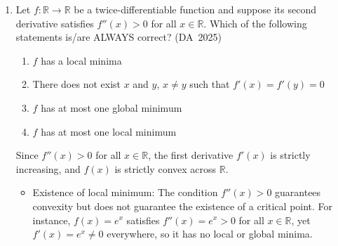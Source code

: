 \begin{enumerate}[label=\thesubsection.\arabic*, ref=\thesubsection.\theenumi]
\begin{itemize}
	\item For any $\vec{x}_k$ ($k \in \{1, \dots, 5\}$):
	\begin{align}
		\vec{A}\vec{x}_k = \sum_{i=1}^5 \vec{x}_i \brak{\vec{x}_i^{\top}\vec{x}_k} = \vec{x}_k \brak{1} = 1\cdot\vec{x}_k \implies \lambda = 1 \quad (\text{multiplicity } 5)
	\end{align}
	\item For any orthogonal vector $\vec{y} \perp \text{span}\cbrak{\vec{x}_1, \dots, \vec{x}_5}$:
	\begin{align}
		\vec{A}\vec{y} = \sum_{i=1}^5 \vec{x}_i \brak{\vec{x}_i^{\top}\vec{y}} = \vec{0} = 0\cdot\vec{y} \implies \lambda = 0 \quad (\text{multiplicity } 5)
	\end{align}
\end{itemize}
Since $\vec{A}$ is real, symmetric, and positive semi-definite ($\lambda_i \ge 0$), its singular values $\sigma_i$ are identical to its eigenvalues:
\begin{align}
	\sigma_i = \abs{\lambda_i} = \lambda_i \implies \sigma_i \in \{0, 1\}
\end{align}
The determinant is given by the product of all 10 eigenvalues:
\begin{align}
	\mydet{\vec{A}} = \prod_{i=1}^{10} \lambda_i = 1^5 \times 0^5 = 0
\end{align}
Since $\mydet{\vec{A}} = 0$, $\vec{A}$ is non-invertible.

	
\item 
Let $f : \mathbb{R} \to \mathbb{R}$ be a twice-differentiable function and suppose its second derivative satisfies $f'' (x) > 0$ for all $x \in \mathbb{R}$. Which of the following statements is/are ALWAYS correct?
\hfill (DA~2025)
\begin{enumerate}
	\item $f$ has a local minima
	\item There does not exist $x$ and $y$, $x \neq y$ such that $f' (x) = f' (y) = 0$
	\item $f$ has at most one global minimum
	\item $f$ has at most one local minimum
\end{enumerate}
\solution
Since $f''(x) > 0$ for all $x \in \mathbb{R}$, the first derivative $f'(x)$ is strictly increasing, and $f(x)$ is strictly convex across $\mathbb{R}$.
\begin{itemize}
	\item Existence of local minimum: The condition $f''(x) > 0$ guarantees convexity but does not guarantee the existence of a critical point. For instance, $f(x) = e^x$ satisfies $f''(x) = e^x > 0$ for all $x \in \mathbb{R}$, yet $f'(x) = e^x \neq 0$ everywhere, so it has no local or global minima. 
	

\end{itemize}
\end{enumerate}
